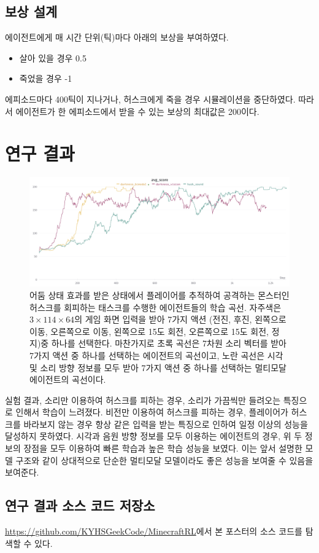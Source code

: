 \documentclass{tudelftposter}
\begin{document}
\subsection{보상 설계}
에이전트에게 매 시간 단위(틱)마다 아래의 보상을 부여하였다.
\begin{itemize}
  \item 살아 있을 경우 0.5
  \item 죽었을 경우 -1
\end{itemize}
에피소드마다 400틱이 지나거나, 허스크에게 죽을 경우 시뮬레이션을 중단하였다. 따라서 에이전트가 한 에피소드에서 받을 수 있는 보상의 최대값은 200이다.

\section{연구 결과}

\begin{figure}
  \centering
  \includegraphics[width=.5\textwidth]{result.png}
  \caption{어둠 상태 효과를 받은 상태에서 플레이어를 추적하여 공격하는 몬스터인 허스크를 회피하는 태스크를 수행한 에이전트들의 학습 곡선. 자주색은 $3\times114\times64$의 게임 화면 입력을 받아 7가지 액션 (전진, 후진, 왼쪽으로 이동, 오른쪽으로 이동, 왼쪽으로 15도 회전, 오른쪽으로 15도 회전, 정지)중 하나를 선택한다. 마찬가지로 초록 곡선은 7차원 소리 벡터를 받아 7가지 액션 중 하나를 선택하는 에이전트의 곡선이고, 노란 곡선은 시각 및 소리 방향 정보를 모두 받아 7가지 액션 중 하나를 선택하는 멀티모달 에이전트의 곡선이다.}
  \label{fig:block}
\end{figure}
실험 결과, 소리만 이용하여 허스크를 피하는 경우, 소리가 가끔씩만 들려오는 특징으로 인해서 학습이 느려졌다. 비전만 이용하여 허스크를 피하는 경우, 플레이어가 허스크를 바라보지 않는 경우 항상 같은 입력을 받는 특징으로 인하여 일정 이상의 성능을 달성하지 못하였다. 시각과 음원 방향 정보를 모두 이용하는 에이전트의 경우, 위 두 정보의 장점을 모두 이용하여 빠른 학습과 높은 학습 성능을 보였다. 이는 앞서 설명한 모델 구조와 같이 상대적으로 단순한 멀티모달 모델이라도 좋은 성능을 보여줄 수 있음을 보여준다.

\subsection{연구 결과 소스 코드 저장소}
\href{https://github.com/KYHSGeekCode/MinecraftRL}{https://github.com/KYHSGeekCode/MinecraftRL}에서 본 포스터의 소스 코드를 탐색할 수 있다.
\end{document}
